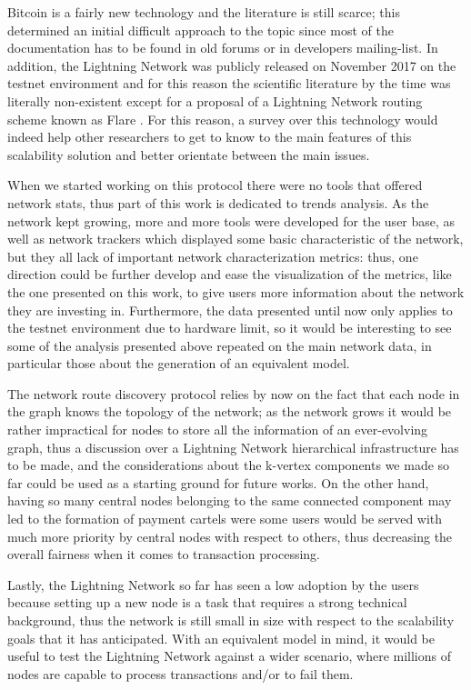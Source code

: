 	Bitcoin is a fairly new technology and the literature is still scarce; this determined an initial difficult approach to the topic since most of the documentation has to be found in old forums or in developers mailing-list. In addition, the Lightning Network was publicly released on November 2017 on the testnet environment and for this reason the scientific literature by the time was literally non-existent except for a proposal of a Lightning Network routing scheme known as Flare \cite{Prihodko2016}. For this reason, a survey over this technology would indeed help other researchers to get to know to the main features of this scalability solution and better orientate between the main issues.
	
	When we started working on this protocol there were no tools that offered network stats, thus part of this work is dedicated to trends analysis. As the network kept growing, more and more tools were developed for the user base, as well as network trackers which displayed some basic characteristic of the network, but they all lack of important network characterization metrics: thus, one direction could be further develop and ease the visualization of the metrics, like the one presented on this work, to give users more information about the network they are investing in. Furthermore, the data presented until now only applies to the testnet environment due to hardware limit, so it would be interesting to see some of the analysis presented above repeated on the main network data, in particular those about the generation of an equivalent model.
	
	The network route discovery protocol relies by now on the fact that each node in the graph knows the topology of the network; as the network grows it would be rather impractical for nodes to store all the information of an ever-evolving graph, thus a discussion over a Lightning Network hierarchical infrastructure has to be made, and the considerations about the k-vertex components we made so far could be used as a starting ground for future works. On the other hand, having so many central nodes belonging to the same connected component may led to the formation of payment cartels were some users would be served with much more priority by central nodes with respect to others, thus decreasing the overall fairness when it comes to transaction processing.
	
	Lastly, the Lightning Network so far has seen a low adoption by the users because setting up a new node is a task that requires a strong technical background, thus the network is still small in size with respect to the scalability goals that it has anticipated. With an equivalent model in mind, it would be useful to test the Lightning Network against a wider scenario, where millions of nodes are capable to process transactions and/or to fail them.
	

